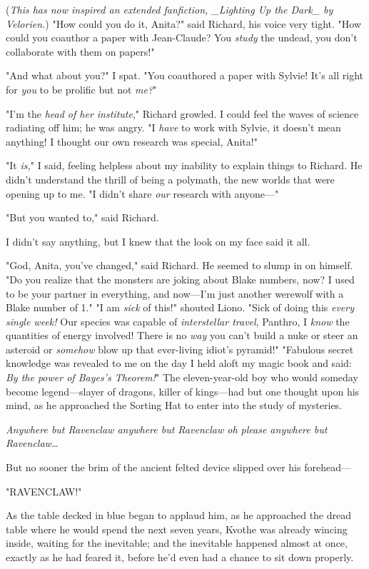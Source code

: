 (\emph{This has now inspired an extended fanfiction, \_Lighting Up the Dark\_ by 
Velorien.})
\sbreak
"How could you do it, Anita?" said Richard, his voice very tight. "How could 
you coauthor a paper with Jean-Claude? You \emph{study} the undead, you don't 
collaborate with them on papers!"

"And what about you?" I spat. "You coauthored a paper with Sylvie! It's all 
right for \emph{you} to be prolific but not \emph{me?}"

"I'm the \emph{head of her institute}," Richard growled. I could feel the waves 
of science radiating off him; he was angry. "I \emph{have} to work with Sylvie, 
it doesn't mean anything! I thought our own research was special, Anita!"

"It \emph{is,}" I said, feeling helpless about my inability to explain things 
to Richard. He didn't understand the thrill of being a polymath, the new worlds 
that were opening up to me. "I didn't share \emph{our} research with anyone---"

"But you wanted to," said Richard.

I didn't say anything, but I knew that the look on my face said it all.

"God, Anita, you've changed," said Richard. He seemed to slump in on himself. 
"Do you realize that the monsters are joking about Blake numbers, now? I used 
to be your partner in everything, and now---I'm just another werewolf with a 
Blake number of 1."
\sbreak
"I am \emph{sick} of this!" shouted Liono. "Sick of doing this \emph{every 
single week!} Our species was capable of \emph{interstellar travel}, Panthro, I 
\emph{know} the quantities of energy involved! There is no \emph{way} you can't 
build a nuke or steer an asteroid or \emph{somehow} blow up that ever-living 
idiot's pyramid!"
\sbreak
"Fabulous secret knowledge was revealed to me on the day I held aloft my magic 
book and said: \emph{By the power of Bayes's Theorem!}"
\sbreak
The eleven-year-old boy who would someday become legend---slayer of dragons, 
killer of kings---had but one thought upon his mind, as he approached the 
Sorting Hat to enter into the study of mysteries.

\emph{Anywhere but Ravenclaw anywhere but Ravenclaw oh please anywhere but 
Ravenclaw{\ldots}}

But no sooner the brim of the ancient felted device slipped over his forehead---

"RAVENCLAW!"

As the table decked in blue began to applaud him, as he approached the dread 
table where he would spend the next seven years, Kvothe was already wincing 
inside, waiting for the inevitable; and the inevitable happened almost at once, 
exactly as he had feared it, before he'd even had a chance to sit down properly.

